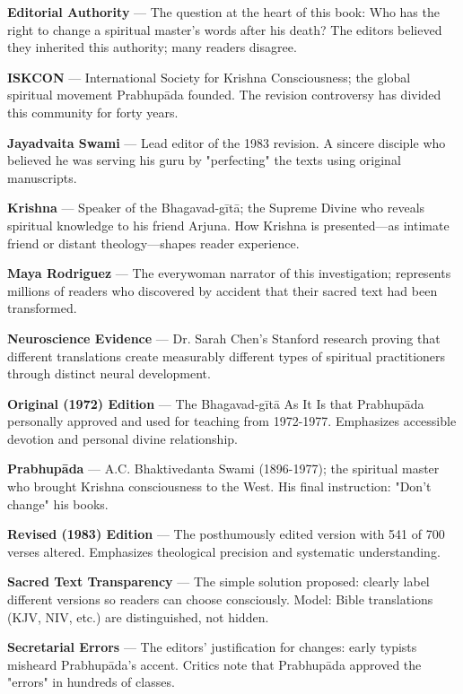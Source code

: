\documentclass[11pt,twoside]{book}
\begin{document}
\textbf{\textbf{Editorial Authority}} — The question at the heart of this book: Who has the right to change a spiritual master's words after his death? The editors believed they inherited this authority; many readers disagree.

\textbf{\textbf{ISKCON}} — International Society for Krishna Consciousness; the global spiritual movement Prabhupāda founded. The revision controversy has divided this community for forty years.

\textbf{\textbf{Jayadvaita Swami}} — Lead editor of the 1983 revision. A sincere disciple who believed he was serving his guru by "perfecting" the texts using original manuscripts.

\textbf{\textbf{Krishna}} — Speaker of the Bhagavad-gītā; the Supreme Divine who reveals spiritual knowledge to his friend Arjuna. How Krishna is presented—as intimate friend or distant theology—shapes reader experience.

\textbf{\textbf{Maya Rodriguez}} — The everywoman narrator of this investigation; represents millions of readers who discovered by accident that their sacred text had been transformed.

\textbf{\textbf{Neuroscience Evidence}} — Dr. Sarah Chen's Stanford research proving that different translations create measurably different types of spiritual practitioners through distinct neural development.

\textbf{\textbf{Original (1972) Edition}} — The Bhagavad-gītā As It Is that Prabhupāda personally approved and used for teaching from 1972-1977. Emphasizes accessible devotion and personal divine relationship.

\textbf{\textbf{Prabhupāda}} — A.C. Bhaktivedanta Swami (1896-1977); the spiritual master who brought Krishna consciousness to the West. His final instruction: "Don't change" his books.

\textbf{\textbf{Revised (1983) Edition}} — The posthumously edited version with 541 of 700 verses altered. Emphasizes theological precision and systematic understanding.

\textbf{\textbf{Sacred Text Transparency}} — The simple solution proposed: clearly label different versions so readers can choose consciously. Model: Bible translations (KJV, NIV, etc.) are distinguished, not hidden.

\textbf{\textbf{Secretarial Errors}} — The editors' justification for changes: early typists misheard Prabhupāda's accent. Critics note that Prabhupāda approved the "errors" in hundreds of classes.
\end{document}

